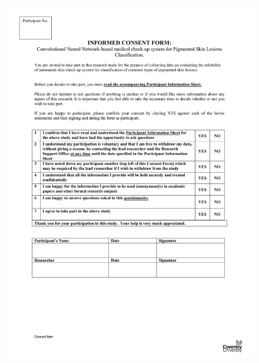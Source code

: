 \begin{figure}[!htp]
    \centering
    \includegraphics[width=\textwidth]{Documents/consent.pdf}
\end{figure}

